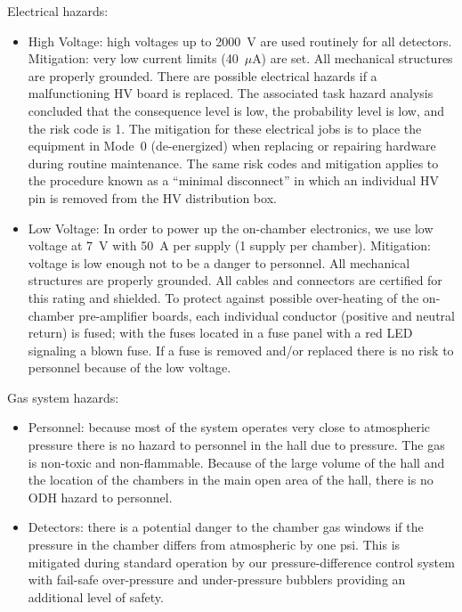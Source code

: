 Electrical hazards:
\begin{itemize}
\item High Voltage: high voltages up to 2000~V are used routinely for all detectors. Mitigation: 
very low current limits (40~$\mu$A) are set. All mechanical structures are properly grounded.  
There are possible electrical hazards if a malfunctioning HV board is replaced. The associated 
task hazard analysis concluded that the consequence level is low, the probability level is low, 
and the risk code is 1. The mitigation for these electrical jobs is to place the equipment in 
Mode~0 (de-energized) when replacing or repairing hardware during routine maintenance. The 
same risk codes and mitigation applies to the procedure known as a ``minimal disconnect'' in 
which an individual HV pin is removed from the HV distribution box.

\item Low Voltage: In order to power up the on-chamber electronics, we use low voltage at 7~V 
with 50~A per supply (1 supply per chamber). Mitigation: voltage is low enough not to be a 
danger to personnel. All mechanical structures are properly grounded. All cables and connectors 
are certified for this rating and shielded. To protect against possible over-heating of the 
on-chamber pre-amplifier boards, each individual conductor (positive and neutral return) is 
fused; with the fuses located in a fuse panel with a red LED signaling a blown fuse. If a 
fuse is removed and/or replaced there is no risk to personnel because of the low voltage.

\end{itemize}

Gas system hazards:
\begin{itemize}
\item Personnel: because most of the system operates very close to atmospheric pressure there 
is no hazard to personnel in the hall due to pressure. The gas is non-toxic and non-flammable.  
Because of the large volume of the hall and the location of the chambers in the main open area 
of the hall, there is no ODH hazard to personnel.
\item Detectors: there is a potential danger to the chamber gas windows if the pressure in the 
chamber differs from atmospheric by one psi. This is mitigated during standard operation by our 
pressure-difference control system with fail-safe over-pressure and under-pressure bubblers 
providing an additional level of safety.
\end{itemize}

